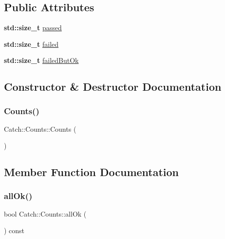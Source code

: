 \subsection*{Public Attributes}
\begin{DoxyCompactItemize}
\item 
\textbf{ std\+::size\+\_\+t} \hyperlink{struct_catch_1_1_counts_ad28daaf3de28006400208b6dd0c631e6}{passed}
\item 
\textbf{ std\+::size\+\_\+t} \hyperlink{struct_catch_1_1_counts_a19982a3817a3bc2c07f0290e71f497a3}{failed}
\item 
\textbf{ std\+::size\+\_\+t} \hyperlink{struct_catch_1_1_counts_ac090973a2ff51394cd452718e75c073e}{failed\+But\+Ok}
\end{DoxyCompactItemize}


\subsection{Constructor \& Destructor Documentation}
\mbox{\label{struct_catch_1_1_counts_aab9092ce70d4b0179cc743555d2fc39b}} 
\subsubsection{\texorpdfstring{Counts()}{Counts()}}
{\footnotesize\ttfamily Catch\+::\+Counts\+::\+Counts (\begin{DoxyParamCaption}{ }\end{DoxyParamCaption})\hspace{0.3cm}{\ttfamily [inline]}}



\subsection{Member Function Documentation}
\mbox{\label{struct_catch_1_1_counts_a33bd996e016030155b99fe1c51c08991}} 
\subsubsection{\texorpdfstring{all\+Ok()}{allOk()}}
{\footnotesize\ttfamily bool Catch\+::\+Counts\+::all\+Ok (\begin{DoxyParamCaption}{ }\end{DoxyParamCaption}) const\hspace{0.3cm}{\ttfamily [inline]}}

